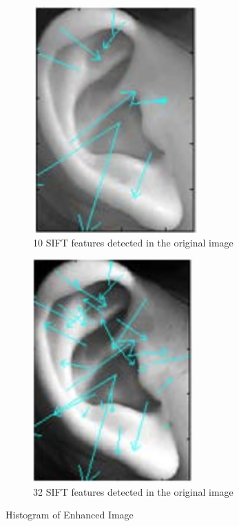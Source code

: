 \begin{figure}
\centering
\begin{subfigure}{.5\textwidth}
  \centering
  \includegraphics[width=.4\linewidth]{Figures/Figure7}
  \caption{10 SIFT features detected in the original image}
  \label{fig:sub5}
\end{subfigure}%
\begin{subfigure}{.5\textwidth}
  \centering
  \includegraphics[width=.4\linewidth]{Figures/Figure8}
  \caption{32 SIFT features detected in the original image}
  \label{fig:sub6}
\end{subfigure}
\caption{Histogram of Enhanced Image}
\label{fig:test}
\end{figure}





